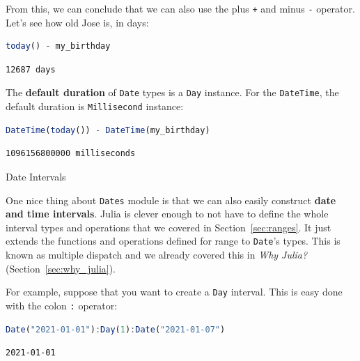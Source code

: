 \documentclass[
  notoc %
]{tufte-book}
\makeatletter
\newcommand{\passthrough}[1]{#1}
\renewcommand\subsubsection{%
\@startsection{subsubsection}{3}{\z@ }{-3.25ex\@plus -1ex \@minus -.2ex}{1.5ex \@plus .2ex}{\normalfont \normalsize \bfseries }
}
\makeatother
\begin{document}
From this, we can conclude that we can also use the plus
\passthrough{\lstinline!+!} and minus \passthrough{\lstinline!-!}
operator. Let's see how old Jose is, in days:

\begin{lstlisting}[language=Julia]
today() - my_birthday
\end{lstlisting}

\begin{lstlisting}[language=Output]
12687 days
\end{lstlisting}

The \textbf{default duration} of \passthrough{\lstinline!Date!} types is
a \passthrough{\lstinline!Day!} instance. For the
\passthrough{\lstinline!DateTime!}, the default duration is
\passthrough{\lstinline!Millisecond!} instance:

\begin{lstlisting}[language=Julia]
DateTime(today()) - DateTime(my_birthday)
\end{lstlisting}

\begin{lstlisting}[language=Output]
1096156800000 milliseconds
\end{lstlisting}

\hypertarget{sec:dates_intervals}{%
\subsubsection{Date Intervals}\label{sec:dates_intervals}}

One nice thing about \passthrough{\lstinline!Dates!} module is that we
can also easily construct \textbf{date and time intervals}. Julia is
clever enough to not have to define the whole interval types and
operations that we covered in Section~\ref{sec:ranges}. It just extends
the functions and operations defined for range to
\passthrough{\lstinline!Date!}'s types. This is known as multiple
dispatch and we already covered this in \emph{Why Julia?}
(Section~\ref{sec:why_julia}).

For example, suppose that you want to create a
\passthrough{\lstinline!Day!} interval. This is easy done with the colon
\passthrough{\lstinline!:!} operator:

\begin{lstlisting}[language=Julia]
Date("2021-01-01"):Day(1):Date("2021-01-07")
\end{lstlisting}

\begin{lstlisting}[language=Output]
2021-01-01
\end{lstlisting}
\end{document}
